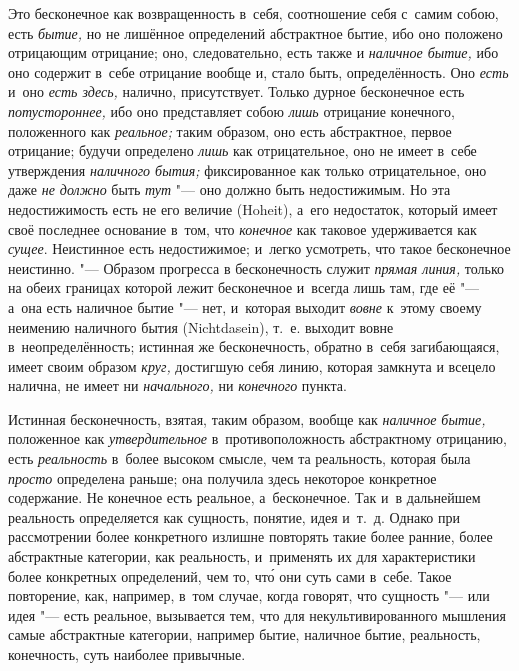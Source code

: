 Это бесконечное как возвращенность в~себя, соотношение себя с~самим собою,
есть {\em бытие,} но не лишённое определений
абстрактное бытие, ибо оно положено отрицающим отрицание; оно,
следовательно, есть также и {\em наличное бытие,} ибо
оно содержит в~себе отрицание вообще и, стало быть, определённость. Оно
{\em есть} и~оно {\em есть здесь,}
налично, присутствует. Только дурное бесконечное есть
{\em потустороннее,} ибо оно представляет собою
{\em лишь} отрицание конечного, положенного как
{\em реальное;} таким образом, оно есть абстрактное,
первое отрицание; будучи определено {\em лишь} как
отрицательное, оно не имеет в~себе утверждения
{\em наличного бытия;} фиксированное как только
отрицательное, оно даже {\em не должно} быть
{\em тут} "--- оно должно быть недостижимым. Но эта
недостижимость есть не его величие (Hoheit), а~его недостаток, который
имеет своё последнее основание в~том, что
{\em конечное} как таковое удерживается как
{\em сущее}. Неистинное есть недостижимое; и~легко
усмотреть, что такое бесконечное неистинно. "--- Образом прогресса в
бесконечность служит {\em прямая линия,} только на
обеих границах которой лежит бесконечное и~всегда лишь там, где её "--- а~она
есть наличное бытие "--- нет, и~которая выходит
{\em вовне} к~этому своему неимению наличного бытия
(Nicht\-dasein), т.~е. выходит вовне в~неопределённость; истинная же
бесконечность, обратно в~себя загибающаяся, имеет своим образом
{\em круг,} достигшую себя линию, которая замкнута и
всецело налична, не имеет ни {\em начального,} ни {\em конечного} пункта.

Истинная бесконечность, взятая, таким образом, вообще как
{\em наличное бытие,} положенное как
{\em утвердительное} в~противоположность абстрактному
отрицанию, есть {\em реальность} в~более высоком
смысле, чем та реальность, которая была {\em просто}
определена раньше; она получила здесь некоторое конкретное содержание. Не
конечное есть реальное, а~бесконечное. Так и~в дальнейшем реальность
определяется как сущность, понятие, идея и~т.~д. Однако при рассмотрении
более конкретного излишне повторять такие более ранние, более абстрактные
категории, как реальность, и~применять их для характеристики более
конкретных определений, чем то, чт\'{о} они суть сами в~себе. Такое повторение,
как, например, в~том случае, когда говорят,
что сущность "--- или идея "--- есть
реальное, вызывается тем, что для некультивированного мышления самые
абстрактные категории, например бытие, наличное бытие, реальность,
конечность, суть наиболее привычные.

